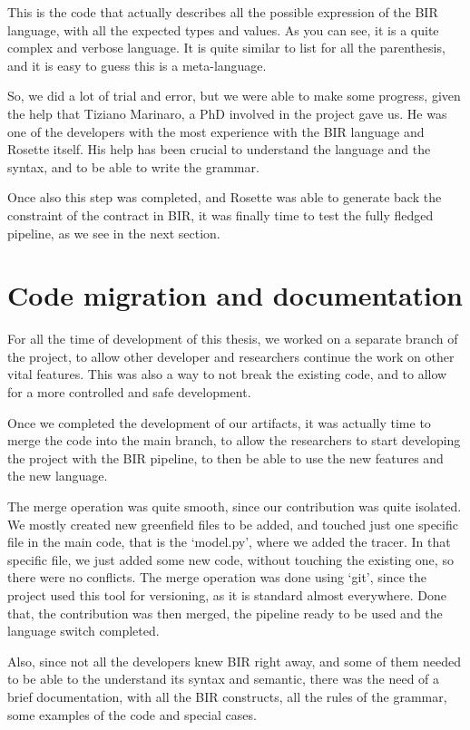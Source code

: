 This is the code that actually describes all the possible expression of the BIR language,
with all the expected types and values. As you can see, it is a quite complex
and verbose language. It is quite similar to list for all the parenthesis, and
it is easy to guess this is a meta-language.

So, we did a lot of trial and error, but we were able to make some progress, given
the help that Tiziano Marinaro, a PhD involved in the project gave us. He was one
of the developers with the most experience with the BIR language and Rosette itself.
His help has been crucial to understand the language and the syntax, and to be able
to write the grammar.

Once also this step was completed, and Rosette was able to generate back the
constraint of the contract in BIR, it was finally time to test the fully fledged
pipeline, as we see in the next section.

\section{Code migration and documentation}
\label{cha:Code migration and documentation} For all the time of development of
this thesis, we worked on a separate branch of the project, to allow other
developer and researchers continue the work on other vital features. This was also
a way to not break the existing code, and to allow for a more controlled and
safe development.

Once we completed the development of our artifacts, it was actually time to merge
the code into the main branch, to allow the researchers to start developing the
project with the BIR pipeline, to then be able to use the new features and the new
language.

The merge operation was quite smooth, since our contribution was quite isolated.
We mostly created new greenfield files to be added, and touched just one
specific file in the main code, that is the `model.py', where we added the
tracer. In that specific file, we just added some new code, without touching the
existing one, so there were no conflicts. The merge operation was done using `git',
since the project used this tool for versioning, as it is standard almost everywhere.
Done that, the contribution was then merged, the pipeline ready to be used and
the language switch completed.

Also, since not all the developers knew BIR right away, and some of them needed
to be able to the understand its syntax and semantic, there was the need of a brief
documentation, with all the BIR constructs, all the rules of the grammar, some
examples of the code and special cases.

